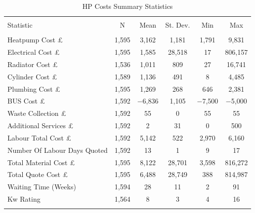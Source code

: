
\begin{table}[!htbp] \centering 
  \caption{HP Costs Summary Statistics} 
  \label{} 
\begin{tabular}{@{\extracolsep{5pt}}lccccc} 
\\[-1.8ex]\hline 
\hline \\[-1.8ex] 
Statistic & \multicolumn{1}{c}{N} & \multicolumn{1}{c}{Mean} & \multicolumn{1}{c}{St. Dev.} & \multicolumn{1}{c}{Min} & \multicolumn{1}{c}{Max} \\ 
\hline \\[-1.8ex] 
Heatpump Cost £ & 1,595 & 3,162 & 1,181 & 1,791 & 9,831 \\ 
Electrical Cost £ & 1,595 & 1,585 & 28,518 & 17 & 806,157 \\ 
Radiator Cost £ & 1,536 & 1,011 & 809 & 27 & 16,741 \\ 
Cylinder Cost £ & 1,589 & 1,136 & 491 & 8 & 4,485 \\ 
Plumbing Cost £ & 1,595 & 1,269 & 268 & 646 & 2,381 \\ 
BUS Cost £ & 1,592 & $-$6,836 & 1,105 & $-$7,500 & $-$5,000 \\ 
Waste Collection £ & 1,592 & 55 & 0 & 55 & 55 \\ 
Additional Services £ & 1,592 & 2 & 31 & 0 & 500 \\ 
Labour Total Cost £ & 1,592 & 5,142 & 522 & 2,970 & 6,160 \\ 
Number Of Labour Days Quoted & 1,592 & 13 & 1 & 9 & 17 \\ 
Total Material Cost £ & 1,595 & 8,122 & 28,701 & 3,598 & 816,272 \\ 
Total Quote Cost £ & 1,595 & 6,488 & 28,749 & 388 & 814,987 \\ 
Waiting Time (Weeks) & 1,594 & 28 & 11 & 2 & 91 \\ 
Kw Rating & 1,564 & 8 & 3 & 4 & 16 \\ 
\hline \\[-1.8ex] 
\end{tabular} 
\end{table} 

